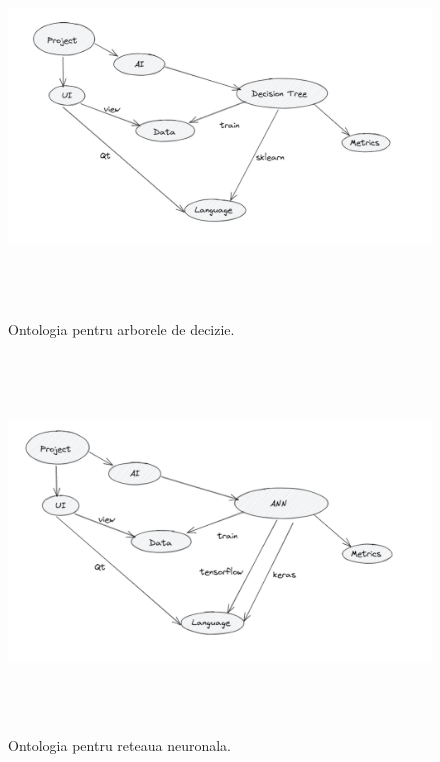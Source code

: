 \documentclass[runningheads,a4paper,11pt]{report}
\begin{document}
\begin{figure}[h!]
\centerline{\includegraphics[width=22cm,height=10cm]{Imagini/ontology_decision_tree.PNG}}
\caption{Ontologia pentru arborele de decizie.}
\label{fig}
\end{figure}

\begin{figure}[h!]
\centerline{\includegraphics[width=22cm,height=10cm]{Imagini/ontology_ann.PNG}}
\caption{Ontologia pentru reteaua neuronala.}
\label{fig}
\end{figure}

\tableofcontents


\newpage
\end{document}
